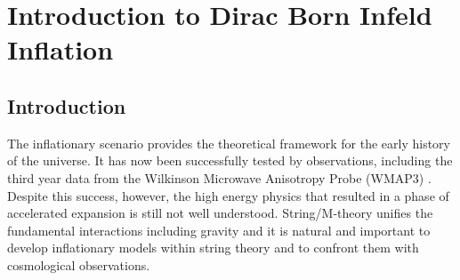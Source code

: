 \renewcommand{\CVSrevision}{\version$Id: dbi-intro.tex,v 1.13 2009/07/28 20:26:19 ith Exp $}
\chapter{Introduction to Dirac Born Infeld Inflation}
\label{ch:dbi-intro}

\section{Introduction}
% 
\label{sec:dbi-intro}


The inflationary scenario provides the 
theoretical framework for the early history 
of the universe. It has now been successfully tested by observations, 
including the third year data from the Wilkinson Microwave Anisotropy 
Probe (WMAP3) \cite{spergel}. Despite this success, however, the high energy 
physics that resulted in a phase of accelerated expansion is still 
not well understood. String/M-theory unifies the fundamental interactions 
including gravity and it is natural and important to 
develop inflationary models within string theory and to confront them with 
cosmological observations. 
 

